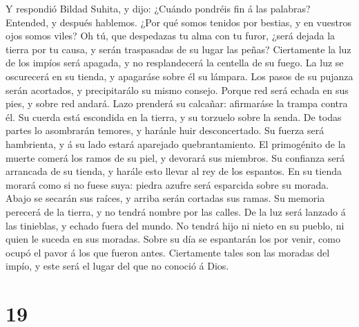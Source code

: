  Y respondió Bildad Suhita, y dijo:  ¿Cuándo
pondréis fin á las palabras? Entended, y después hablemos. 
¿Por qué somos tenidos por bestias, y en vuestros ojos somos viles?
 Oh tú, que despedazas tu alma con tu furor, ¿será dejada la
tierra por tu causa, y serán traspasadas de su lugar las peñas?
 Ciertamente la luz de los impíos será apagada, y no
resplandecerá la centella de su fuego.  La luz se oscurecerá
en su tienda, y apagaráse sobre él su lámpara.  Los pasos de
su pujanza serán acortados, y precipitarálo su mismo consejo.
 Porque red será echada en sus pies, y sobre red andará.
 Lazo prenderá su calcañar: afirmaráse la trampa contra él.
 Su cuerda está escondida en la tierra, y su torzuelo sobre
la senda.  De todas partes lo asombrarán temores, y haránle
huir desconcertado.  Su fuerza será hambrienta, y á su lado
estará aparejado quebrantamiento.  El primogénito de la
muerte comerá los ramos de su piel, y devorará sus miembros.
 Su confianza será arrancada de su tienda, y harále esto
llevar al rey de los espantos.  En su tienda morará como si
no fuese suya: piedra azufre será esparcida sobre su morada.
 Abajo se secarán sus raíces, y arriba serán cortadas sus
ramas.  Su memoria perecerá de la tierra, y no tendrá
nombre por las calles.  De la luz será lanzado á las
tinieblas, y echado fuera del mundo.  No tendrá hijo ni
nieto en su pueblo, ni quien le suceda en sus moradas. 
Sobre su día se espantarán los por venir, como ocupó el pavor á los que
fueron antes.  Ciertamente tales son las moradas del impío,
y este será el lugar del que no conoció á Dios.

\hypertarget{section-18}{%
\section{19}\label{section-18}}

